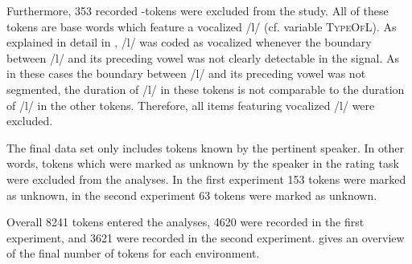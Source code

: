 Furthermore, 353 recorded -tokens were excluded from the study. %
All of these tokens are base words which feature a vocalized /l/ (cf. variable \textsc{TypeOfL}). As explained in detail in , /l/ was coded as vocalized whenever the boundary between /l/ and its preceding vowel was not clearly detectable in the signal. As in these cases the boundary between /l/ and its preceding vowel was not segmented, 
the duration of /l/ in these tokens is not comparable to the duration of /l/ in the other tokens. Therefore, all items featuring vocalized /l/ were excluded.



 The final data set only includes tokens known by the pertinent speaker. In other words, tokens which were marked as unknown by the speaker in the rating task were excluded from the analyses. In the first experiment 153 tokens were marked as unknown, in the second experiment 63 tokens were marked as unknown.
 
 Overall 8241 tokens entered the analyses, 4620 were recorded in the first experiment, and  3621 were recorded in the second experiment.  gives an overview of the final number of tokens for each environment. 
  


